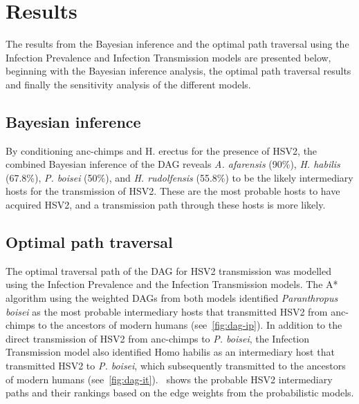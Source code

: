 \documentclass[fleqn,10pt]{wlscirep}
\begin{document}
\section*{Results}

The results from the Bayesian inference and the optimal path traversal using the Infection Prevalence and Infection Transmission models are presented below, beginning with the Bayesian inference analysis, the optimal path traversal results and finally the sensitivity analysis of the different models.

\subsection*{Bayesian inference}
By conditioning anc-chimps and H. erectus for the presence of HSV2, the combined Bayesian inference of the DAG reveals \textit{A. afarensis} (90\%), \textit{H. habilis} (67.8\%), \textit{P. boisei}  (50\%), and \textit{H. rudolfensis} (55.8\%) to be the likely intermediary hosts for the transmission of HSV2. These are the most probable hosts to have acquired HSV2, and a transmission path through these hosts is more likely.

\subsection*{Optimal path traversal}
The optimal traversal path of the DAG for HSV2 transmission was modelled using the Infection Prevalence and the Infection Transmission models. The A* algorithm using the weighted DAGs from both models identified \textit{Paranthropus boisei} as the most probable intermediary hosts that transmitted HSV2 from anc-chimps to the ancestors of modern humans (see~\cref{fig:dag-ip}). In addition to the direct transmission of HSV2 from anc-chimps to \textit{P. boisei}, the Infection Transmission model also identified Homo habilis as an intermediary host that transmitted HSV2 to \textit{P. boisei}, which subsequently transmitted to the ancestors of modern humans (see~\cref{fig:dag-it}).~ shows the probable HSV2 intermediary paths and their rankings based on the edge weights from the probabilistic models. 
\end{document}

